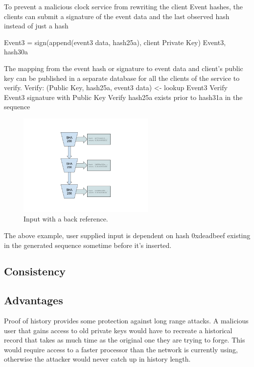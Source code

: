 \documentclass[12pt]{article}
\begin{document}
To prevent a malicious clock service from rewriting the client Event hashes, the clients can submit a signature of the event data and the last observed hash instead of just a hash

Event3 = sign(append(event3 data, hash25a), client Private Key)
Event3, hash30a

The mapping from the event hash or signature to event data and client’s public key can be published in a separate database for all the clients of the service to verify.
Verify:
	(Public Key, hash25a, event3 data) <- lookup Event3 
      Verify Event3 signature with Public Key
      Verify hash25a exists prior to hash31a in the sequence

\begin{figure}
  \begin{center}
    \centering
    \includegraphics[width=0.6\textwidth]{figures/fig_1.png}
    \caption[Fig 5]{Input with a back reference.\label{fig_1}}
  \end{center}
  \end{figure}

The above example, user supplied input is dependent on hash 0xdeadbeef existing in the generated sequence sometime before it’s inserted.
\subsection{Consistency}
\subsection{Advantages}

Proof of history provides some protection against long range attacks.  A malicious user that gains access to old private keys would have to recreate a historical record that takes as much time as the original one they are trying to forge.  This would require access to a faster processor than the network is currently using, otherwise the attacker would never catch up in history length.
\end{document}
